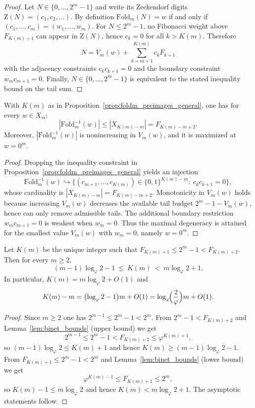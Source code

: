\begin{proof}
Let $N\in\{0,\dots,2^m-1\}$ and write its Zeckendorf digits $\mathrm{Z}(N)=(c_1,c_2,\dots)$.
By definition $\mathrm{Fold}_m(N)=w$ if and only if $(c_1,\dots,c_m)=(w_1,\dots,w_m)$.
For $N\le 2^m-1$, no Fibonacci weight above $F_{K(m)+1}$ can appear in $\mathrm{Z}(N)$, hence $c_k=0$ for all $k>K(m)$.
Therefore
\[
N=V_m(w)+\sum_{k=m+1}^{K(m)} c_k F_{k+1}
\]
with the adjacency constraints $c_kc_{k+1}=0$ and the boundary constraint $w_m c_{m+1}=0$.
Finally, $N\in\{0,\dots,2^m-1\}$ is equivalent to the stated inequality bound on the tail sum.
\end{proof}

\begin{corollary}
\label{cor:foldm_degeneracy_bound}
With $K(m)$ as in Proposition~\ref{prop:foldm_preimages_general}, one has for every $w\in X_m$:
\[
|\mathrm{Fold}_m^{-1}(w)|\le |X_{K(m)-m}|=F_{K(m)-m+2}.
\]
Moreover, $|\mathrm{Fold}_m^{-1}(w)|$ is nonincreasing in $V_m(w)$, and it is maximized at $w=0^m$.
\end{corollary}

\begin{proof}
Dropping the inequality constraint in Proposition~\ref{prop:foldm_preimages_general} yields an injection
\[
\mathrm{Fold}_m^{-1}(w)\hookrightarrow \{(c_{m+1},\dots,c_{K(m)})\in\{0,1\}^{K(m)-m}:\ c_kc_{k+1}=0\},
\]
whose cardinality is $|X_{K(m)-m}|=F_{K(m)-m+2}$.
Monotonicity in $V_m(w)$ holds because increasing $V_m(w)$ decreases the available tail budget $2^m-1-V_m(w)$, hence can only remove admissible tails.
The additional boundary restriction $w_m c_{m+1}=0$ is weakest when $w_m=0$.
Thus the maximal degeneracy is attained for the smallest value $V_m(w)$ with $w_m=0$, namely $w=0^m$.
\end{proof}

\begin{proposition}
\label{prop:Km_bounds}
Let $K(m)$ be the unique integer such that $F_{K(m)+1}\le 2^m-1< F_{K(m)+2}$.
Then for every $m\ge 2$,
\[
(m-1)\log_\varphi 2-1\ \le\ K(m)\ <\ m\log_\varphi 2+1.
\]
In particular, $K(m)=m\log_\varphi 2+O(1)$ and
\[
K(m)-m=\bigl(\log_\varphi 2-1\bigr)m+O(1)=\log_\varphi\!\Bigl(\frac{2}{\varphi}\Bigr)m+O(1).
\]
\end{proposition}

\begin{proof}
Since $m\ge 2$ one has $2^{m-1}\le 2^m-1<2^m$.
From $2^m-1< F_{K(m)+2}$ and Lemma~\ref{lem:binet_bounds} (upper bound) we get
\[
2^{m-1}\le 2^m-1< F_{K(m)+2}\le \varphi^{K(m)+1},
\]
so $(m-1)\log_\varphi 2\le K(m)+1$ and hence $K(m)\ge (m-1)\log_\varphi 2-1$.
From $F_{K(m)+1}\le 2^m-1<2^m$ and Lemma~\ref{lem:binet_bounds} (lower bound) we get
\[
\varphi^{K(m)-1}\le F_{K(m)+1}\le 2^m,
\]
so $K(m)-1\le m\log_\varphi 2$ and hence $K(m)<m\log_\varphi 2+1$.
The asymptotic statements follow.
\end{proof}

